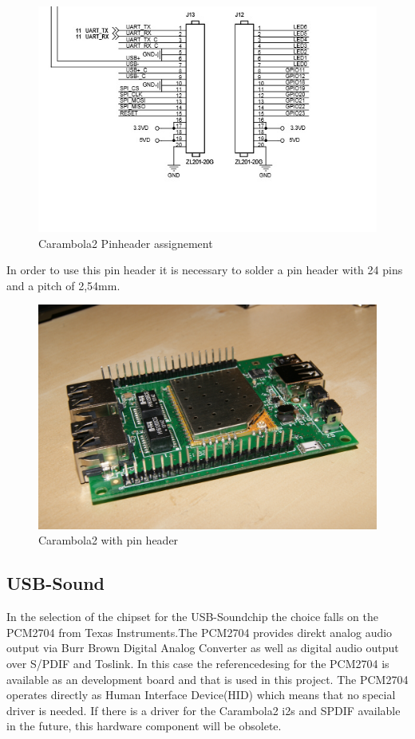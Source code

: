 \begin{figure}[h!]
	\begin{center}
	\includegraphics[scale=0.4]{pictures/carambola2_gpios}
	\caption{Carambola2 Pinheader assignement}
	\end{center}
\end{figure}

In order to use this pin header it is necessary to solder a pin header with 24 pins and a pitch of 2,54mm.

\begin{figure}[h!]
	\begin{center}
	\includegraphics[scale=0.07]{pictures/carambola2_withPinHeader}
	\caption{Carambola2 with pin header}
	\end{center}
\end{figure}
\subsection{USB-Sound}
In the selection of the chipset for the USB-Soundchip the choice falls on the PCM2704 from Texas Instruments.The PCM2704 provides direkt analog audio output via Burr Brown Digital Analog Converter as well as digital audio output over S/PDIF and Toslink. In this case the referencedesing for the PCM2704 is available as an development board and that is used in this project. The PCM2704 operates directly as Human Interface Device(HID) which means that no special driver is needed. If there is a driver for the Carambola2 i2s and SPDIF available in the future, this hardware component will be obsolete.

